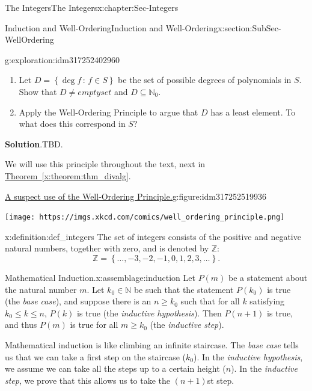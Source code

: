 \documentclass[oneside,10pt,]{book}
\newcommand{\blocktitlefont}{\relax}
\newcommand{\xreffont}{\relax}
\numberwithin{equation}{section}
\renewcommand{\le}{\leqslant}
\renewcommand{\ge}{\geqslant}
\newcommand{\set}[1]{\left\{ {#1} \right\}}
\newcommand{\setof}[2]{{\left\{#1\,\colon\,#2\right\}}}
\def\Z{{\mathbb Z}}
\def\N{{\mathbb N}}
\begin{document}
\begin{chapterptx}{The Integers}{}{The Integers}{}{}{x:chapter:Sec-Integers}
\begin{sectionptx}{Induction and Well-Ordering}{}{Induction and Well-Ordering}{}{}{x:section:SubSec-WellOrdering}
\begin{exploration}{}{g:exploration:idm317252402960}
\begin{enumerate}
\item{}Let \(D = \setof{\deg f}{f\in S}\) be the set of possible degrees of polynomials in \(S\). Show that \(D\ne emptyset\) and \(D\subseteq \N_0\).%
\item{}Apply the Well-Ordering Principle to argue that \(D\) has a least element. To what does this correspond in \(S\)?%
\end{enumerate}
\par\smallskip%
\noindent\textbf{\blocktitlefont Solution}.\hypertarget{g:solution:idm317252415648}{}\quad{}TBD.\end{exploration}
We will use this principle throughout the text, next in \hyperref[x:theorem:thm_divalg]{Theorem~{\xreffont\ref{x:theorem:thm_divalg}}}.%
\begin{figureptx}{\href{https://www.xkcd.com/2193/}{A suspect use of the Well-Ordering Principle.}}{g:figure:idm317252519936}{}%
\begin{image}{0.175}{0.65}{0.175}%
\texttt{[image: https://imgs.xkcd.com/comics/well\_ordering\_principle.png]}
\end{image}%
\tcblower
\end{figureptx}%
\begin{definition}{}{x:definition:def_integers}%
\index{\(\Z\)} The set of integers consists of the positive and negative natural numbers, together with zero, and is denoted by \(\Z\):%
\begin{equation*}
\Z = \set{\ldots, -3, -2, -1, 0, 1, 2, 3, \ldots}\text{.}
\end{equation*}
%
\end{definition}
\begin{assemblage}{Mathematical Induction.}{x:assemblage:induction}%
Let \(P(m)\) be a statement about the natural number \(m\)\footnotemark{}. Let \(k_0\in \N\) be such that the statement \(P(k_0)\) is true (the \emph{base case}), and suppose there is an \(n\ge k_0\) such that for all \(k\) satisfying \(k_0 \le k \le n\), \(P(k)\) is true (the \emph{inductive hypothesis}). Then \(P(n+1)\) is true, and thus \(P(m)\) is true for all \(m\ge k_0\) (the \emph{inductive step}).%
\end{assemblage}
%
Mathematical induction is like climbing an infinite staircase. The \emph{base case} tells us that we can take a first step on the staircase (\(k_0\)). In the \emph{inductive hypothesis}, we assume we can take all the steps up to a certain height (\(n\)). In the \emph{inductive step}, we prove that this allows us to take the \((n+1)\)st step.%

\end{sectionptx}
\end{chapterptx}
\end{document}
